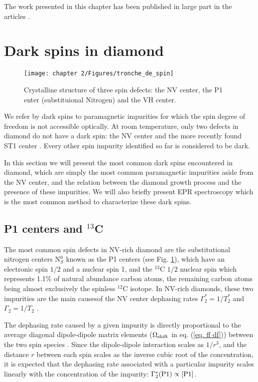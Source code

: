 \documentclass[a4paper, 11pt]{report}
\begin{document}
The work presented in this chapter has been published in large part in the articles \citep{pellet2021optical, ngambou2022improving}.


\section{Dark spins in diamond}

\begin{figure}[h!]
\centering
\texttt{[image: chapter 2/Figures/tronche\_de\_spin]}
\caption{Crystalline structure of three spin defects: the NV center, the P1 enter (substituional Nitrogen) and the VH center.} 
\label{repr NV P1 VH}
\end{figure}

We refer by dark spins to paramagnetic impurities for which the spin degree of freedom is not accessible optically. At room temperature, only two defects in diamond do not have a dark spin: the NV center and the more recently found ST1 center \citep{lee2013readout, john2017bright}. Every other spin impurity identified so far is considered to be dark.

In this section we will present the most common dark spins encountered in diamond, which are simply the most common paramagnetic impurities aside from the NV center, and the relation between the diamond growth process and the presence of these impurities. We will also briefly present EPR spectroscopy which is the most common method to characterize these dark spins.

\subsection{P1 centers and $^{13}$C}
The most common spin defects in NV-rich diamond are the substitutional nitrogen centers N$^0_S$ known as the P1 centers (see Fig. \ref{repr NV P1 VH}), which have an electronic spin $1/2$ and a nuclear spin 1, and the $^{13}$C $1/2$ nuclear spin which represents 1.1\% of natural abundance carbon atoms, the remaining carbon atoms being almost exclusively the spinless $^{12}$C isotope. In NV-rich diamonds, these two impurities are the main causesof the NV center dephasing rates $\Gamma_2^*=1/T_2^*$ and $\Gamma_2=1/T_2$ \citep{barry2020sensitivity}. 

The dephasing rate caused by a given impurity is directly proportional to the average diagonal dipole-dipole matrix elements ($\Omega_{\rm shift}$ in eq. (\ref{eq. ff df})) between the two spin species \citep{taylor2008high, bauch2020decoherence}. Since the dipole-dipole interaction scales as $1/r^3$, and the distance $r$ between each spin scales as the inverse cubic root of the concentration, it is expected that the dephasing rate associated with a particular impurity scales linearly with the concentration of the impurity: $\Gamma_2^*(\rm P1) \propto [P1]$. 
\end{document}
